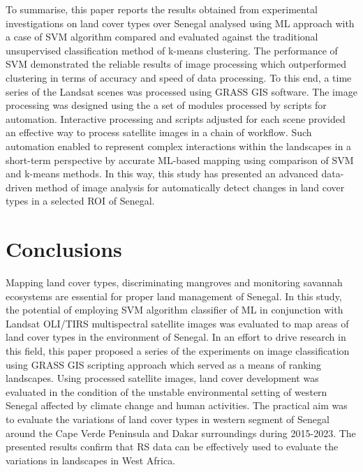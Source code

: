 \documentclass[earth,article,submit,pdftex,moreauthors]{Definitions/mdpi}
\begin{document}
{To summarise, this paper reports the results obtained from experimental investigations on land cover types over Senegal analysed using {ML} approach with a case of {SVM} algorithm compared and evaluated against the traditional unsupervised classification method of k-means clustering. The performance of SVM demonstrated {the }reliable results {of image processing which }outperformed clustering in terms of accuracy and speed of data processing. To this end, {a }time series of the{ }Landsat {scenes was} processed using GRASS GIS software. The image processing was designed using the {a set of modules processed by scripts for automation. }Interactive processing and scripts adjusted for each scene provided an effective way to process satellite images {in a chain of workflow}. Such automation enabled to represent complex interactions within the landscapes in a short-term perspective{ }by accurate {ML}-based {mapping} {using comparison of SVM and k-means methods}. In this way, this study has presented an advanced data-driven method of image analysis for automatically detect changes in land cover types in a selected ROI of Senegal{.}

\section{Conclusions}

{Mapping land cover types, discriminating mangroves and monitoring savannah ecosystems {are} essential for proper land management of Senegal. In {this} study, the potential of employing SVM algorithm classifier {of ML }in conjunction with Landsat OLI/TIRS multispectral satellite images was evaluated to map areas {of} land cover types in the environment of Senegal{.} }In an effort to drive research in this field, this paper proposed a series of the experiments on image classification using GRASS GIS scripting approach which served as a means of ranking landscapes{. Using processed satellite images, }land cover development {was evaluated} in the condition of the unstable environmental setting of western Senegal{ }affected by climate change {and human activities}. {{The practical} aim was }to evaluate the variations {of} land cover types in western segment of Senegal around the Cape Verde Peninsula and Dakar surroundings{ during} 2015-2023. The presented results confirm that {RS} data{ }can be effectively used to evaluate the variations in landscapes in West Africa{.} 

}
\end{document}
